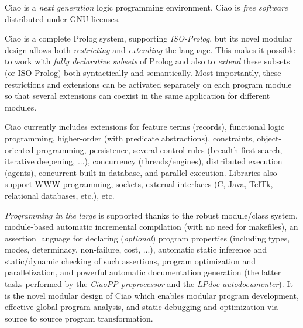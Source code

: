 \documentclass{article}
\newcommand{\ciao}{\psfig{figure=ciao_s.ps,width=2.5cm}}
\begin{document}
\pagestyle{empty}

\twocolumn[
\noindent
\hbox{
\begin{Huge}
{\bf The 
\begin{minipage}[c]{0.3\textwidth}
\ciao
\end{minipage}
1.8 Prolog System}\\
\end{Huge}
}
\vspace{0.5\baselineskip}
]

Ciao is a \emph{next generation} logic programming environment. Ciao is
\emph{free software} distributed under GNU licenses.

Ciao is a complete Prolog system, supporting \emph{ISO-Prolog}, but
its novel modular design allows both \emph{restricting} and
\emph{extending} the language. This makes it possible to work with
\emph{fully declarative subsets} of Prolog and also to \emph{extend}
these subsets (or ISO-Prolog) both syntactically and semantically.
Most importantly, these restrictions and extensions can be activated
separately on each program module so that several extensions can 
coexist in the same application for different modules.

Ciao currently includes extensions for feature terms (records),
functional logic programming, higher-order (with predicate
abstractions), constraints, object-oriented programming, persistence,
several control rules (breadth-first search, iterative deepening,
...), concurrency (threads/engines), distributed execution (agents),
concurrent built-in database, and parallel execution.  Libraries also
support WWW programming, sockets, external interfaces (C, Java, TclTk,
relational databases, etc.), etc.

\emph{Programming in the large} is supported thanks to the robust
module/class system, module-based automatic incremental compilation
(with no need for makefiles), an assertion language for declaring
(\emph{optional}) program properties (including types, modes,
determinacy, non-failure, cost, ...), automatic static inference and
static/dynamic checking of such assertions, program optimization and
parallelization, and powerful automatic documentation generation (the
latter tasks performed by the \emph{CiaoPP preprocessor} and the
\emph{LPdoc autodocumenter}).  It is the novel modular design of Ciao
which enables modular program development, effective global program
analysis, and static debugging and optimization via source to source
program transformation.
\end{document}
